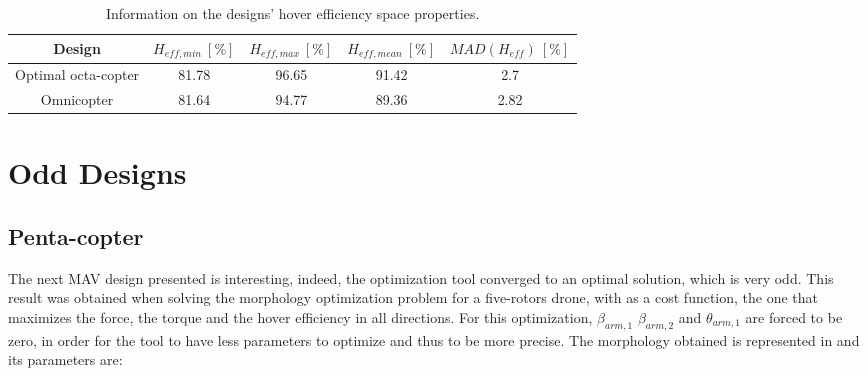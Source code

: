 \begin{table}[!ht]
\begin{center}
 \caption{Information on the designs’ torque space properties.}\vspace{1ex}
 \label{tab:tab_Octa_compare_torque}
\end{center}
\end{table}

{\scriptsize\begin{table}[!ht]
\begin{center}
 \caption{Information on the designs’ hover efficiency space properties.}\vspace{1ex}
 \label{tab:tab_Octa_compare_hover}
 {\scriptsize\begin{tabular}{|c|cccc|}
 \hline
  Design & $H_{eff,min}\ [\%]$ & $H_{eff,max}\ [\%]$ & $H_{eff,mean}\ [\%]$
  & $MAD(H_{eff})\ [\%]$\\ \hline
  Optimal octa-copter & 81.78 & 96.65 & 91.42 & 2.7\\
  Omnicopter & 81.64 & 94.77 & 89.36 & 2.82\\
 \hline
\end{tabular}}
\end{center}
\end{table}}

\clearpage

\section{Odd Designs}
\label{sec:odd_designs}

\subsection{Penta-copter}
\label{sec:penta_copter}

The next MAV design presented is interesting, indeed, the optimization tool
converged to an optimal solution, which is very odd. This result was obtained
when solving the morphology optimization problem for a five-rotors drone,
with as a cost function, the one that maximizes the force, the torque and the
hover efficiency in all directions. For this optimization, $\beta_{arm,1}$
$\beta_{arm,2}$ and $\theta_{arm,1}$ are forced to be zero,
in order for the tool to have less parameters to optimize and thus to be more
precise. The morphology obtained is represented in 
and its parameters are:

